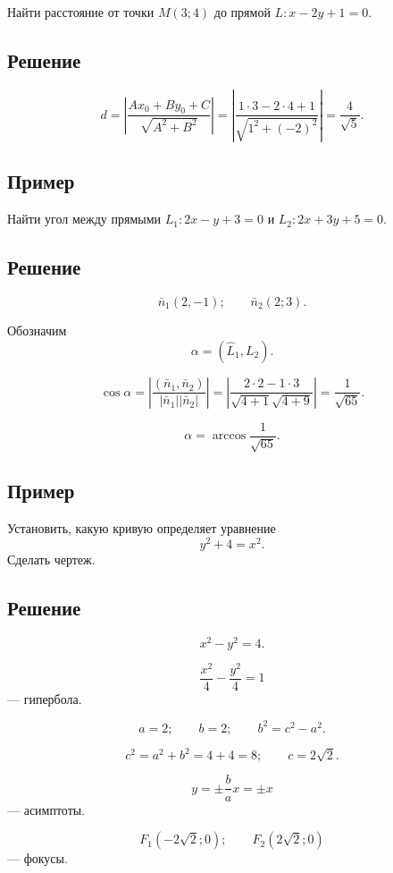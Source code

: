 \documentclass[12pt,a4paper]{article}
\begin{document}
Найти расстояние от точки $M(3;4)$ до прямой $L:x-2y+1=0$.

\subsection*{\textbf{Решение}}

$$
d=
\left|
\frac{Ax_0+By_0+C}{\sqrt{A^2+B^2}}
\right|
=
\left|
\frac{1\cdot3-2\cdot4+1}{\sqrt{1^2+(-2)^2}}
\right|
=
\frac4{\sqrt5}.
$$

\subsection*{\textbf{Пример}}

Найти угол между прямыми $L_1:2x-y+3=0$ и $L_2:2x+3y+5=0$.

\subsection*{\textbf{Решение}}

$$
\bar n_1(2,-1);\qquad \bar n_2(2;3).
$$

Обозначим
$$
\alpha=(\hat L_1,L_2).
$$

$$
\cos\alpha=
\left|
\frac{(\bar n_1,\bar n_2)}{|\bar n_1||\bar n_2|}
\right|
=
\left|
\frac{2\cdot2-1\cdot3}{\sqrt{4+1}\sqrt{4+9}}
\right|
=
\frac1{\sqrt{65}}.
$$

$$
\alpha=\arccos\frac1{\sqrt{65}}.
$$

\subsection*{\textbf{Пример}}

Установить, какую кривую определяет уравнение
$$
y^2+4=x^2.
$$
Сделать чертеж.

\subsection*{\textbf{Решение}}

$$
x^2-y^2=4.
$$

$$
\frac{x^2}{4}-\frac{y^2}{4}=1
$$
--- гипербола.

$$
a=2;\qquad b=2;\qquad b^2=c^2-a^2.
$$

$$
c^2=a^2+b^2=4+4=8;\qquad c=2\sqrt2.
$$

$$
y=\pm\frac bax=\pm x
$$
--- асимптоты.

$$
F_1(-2\sqrt2;0);\qquad F_2(2\sqrt2;0)
$$
--- фокусы.
\end{document}
